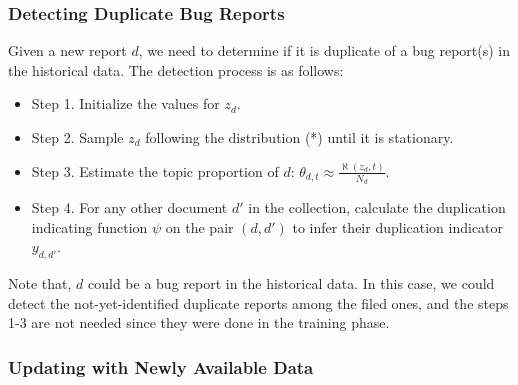 
\subsubsection{Detecting Duplicate Bug Reports}

Given a new report $d$, we need to determine if it is
duplicate of a bug report(s) in the historical data. The
detection process is as follows:

\begin{itemize}

\item Step 1. Initialize the values for $z_d$.

\item Step 2. Sample $z_d$ following the distribution (*) until it is
stationary.

\item Step 3. Estimate the topic proportion of $d$: $\theta_{d,t} \approx
\frac {\aleph(z_d,t)} {N_d}$.

\item Step 4. For any other document $d'$ in the collection, calculate the
duplication indicating function $\psi$ on the pair $(d, d')$ to infer
their duplication indicator $y_{d,d'}$.

\end{itemize}

Note that, $d$ could be a bug report in the historical data. In this
case, we could detect the not-yet-identified duplicate reports among
the filed ones, and the steps 1-3 are not needed since they were
done in the training phase.


\subsubsection{Updating with Newly Available Data}



